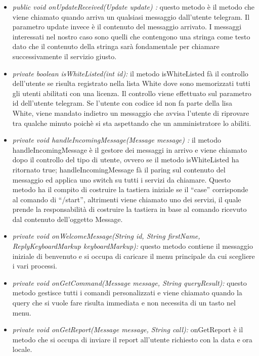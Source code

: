 \begin{itemize}
\item \textit{public void onUpdateReceived(Update update) :}  
questo metodo è il metodo che viene chiamato quando arriva un qualsiasi messaggio dall’utente telegram. Il parametro update invece è il contenuto del messaggio arrivato. I messaggi interessati nel nostro caso sono quelli che contengono una stringa come testo dato che il contenuto della stringa sarà fondamentale per chiamare successivamente il servizio giusto.

\item \textit{private boolean isWhiteListed(int id):}
il metodo isWhiteListed fà il controllo dell’utente se risulta registrato nella lista White dove sono memorizzati tutti gli utenti abilitati con una licenza. Il controllo viene effettuato sul parametro id dell’utente telegram. Se l’utente con codice id non fa parte della lisa White, viene mandato indietro un messaggio che avvisa l’utente di riprovare tra qualche minuto poichè si sta aspettando che un amministratore lo abiliti. 

\item \textit{private void handleIncomingMessage(Message message) :}
il metodo handleIncomingMessage è il gestore dei messaggi in arrivo e viene chiamato dopo il controllo del tipo di utente, ovvero se il metodo isWhiteListed ha ritornato true; 
handleIncomingMessage fà il paring sul contenuto del messaggio ed applica uno switch su  tutti i servizi da chiamare. Questo metodo ha il compito di costruire la tastiera iniziale se il “case” corrisponde al comando di “/start”, altrimenti viene chiamato uno dei servizi, il quale prende la responsabilità di costruire la tastiera in base al comando ricevuto dal contenuto dell’oggetto Message.

	 \item \textit{private void onWelcomeMessage(String id, String firstName, ReplyKeyboardMarkup keyboardMarkup):} questo metodo contiene il messaggio iniziale di benvenuto e si occupa di caricare il menu principale da cui scegliere i vari processi. 

 \item \textit{private void onGetCommand(Message message, String queryResult):}
questo metodo gestisce tutti i comandi personalizzati e viene chiamato quando la query che si vuole fare risulta immediata e non necessita di un tasto nel menu.

 \item \textit{private void onGetReport(Message message, String call):}
onGetReport è il metodo che si occupa di inviare il report all’utente richiesto con la data e ora locale.


\end{itemize}
